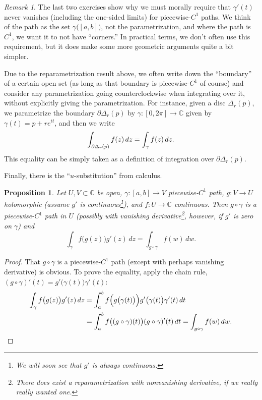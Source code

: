 \documentclass[12pt,openany]{book}
\newcommand{\avoidbreak}{\postdisplaypenalty=100}
\newcommand{\C}{{\mathbb{C}}}
\newcommand{\myquote}[1]{``#1''}
\theoremstyle{plain}
\newtheorem{prop}[thm]{Proposition}
\theoremstyle{remark}
\newtheorem{remark}[thm]{Remark}
\theoremstyle{definition}
\theoremstyle{exercise}
\theoremstyle{example}
\begin{document}
\begin{remark}
The last two exercises show why we must morally
require that $\gamma'(t)$ never vanishes (including the one-sided limits)
for piecewise-$C^1$ paths.
We think of the path
as the set
$\gamma\bigl([a,b]\bigr)$,
not the parametrization, and where the path is $C^1$,
we want it to not have \myquote{corners.}
In practical terms, we don't often use this requirement,
but it does make some more geometric arguments quite a bit simpler.
\end{remark}

Due to the reparametrization result above,
we often write down the \myquote{boundary} of a certain open set
(as long as that boundary is piecewise-$C^1$ of course)
and consider any parametrization going counterclockwise
when integrating over it, without explicitly giving the parametrization.
For instance, given a disc $\Delta_r(p)$, we parametrize
the boundary $\partial \Delta_r(p)$ by
$\gamma  \colon [0,2\pi] \to \C$ given by $\gamma(t) = p +
re^{it}$, and then we write
%
\begin{equation*}
\int_{\partial \Delta_r(p)} f(z) \, dz
=
\int_{\gamma} f(z) \, dz .
\avoidbreak
\end{equation*}
This equality can be simply taken as a definition of integration over
$\partial \Delta_r(p)$.

Finally, there is the \myquote{$u$-substitution} from calculus.

\begin{prop} \label{prop:usubst}
Let $U,V \subset \C$ be open, $\gamma \colon [a,b] \to V$ 
piecewise-$C^1$ path, $g \colon V \to U$ holomorphic (assume $g'$ is
continuous\footnote{We will soon see that $g'$ is always continuous.}), and $f \colon U \to \C$
continuous.  Then $g \circ \gamma$ is a piecewise-$C^1$ path in $U$
(possibly with vanishing derivative\footnote{%
There does exist a reparametrization with nonvanishing derivative, if we really
really wanted one.},
however, if $g'$ is zero on $\gamma$) and
\begin{equation*}
\int_{\gamma} f\bigl(g(z)\bigr) g'(z) \, dz
=
\int_{g \circ \gamma} f(w) \, dw .
\end{equation*}
\end{prop}

\begin{proof}
That $g \circ \gamma$ is a piecewise-$C^1$ path (except with perhaps
vanishing derivative) is obvious.  To prove the equality,
apply the chain rule,
$(g \circ \gamma)'(t) = g'\bigl(\gamma(t)\bigr) \gamma'(t)$:
\begin{equation*}
\begin{split}
\int_{\gamma} f\bigl(g(z)\bigr) g'(z) \, dz
& =
\int_a^b
f\Bigl(g\bigl(\gamma(t)\bigr)\Bigr) g'\bigl(\gamma(t)\bigr) \gamma'(t) \, dt
\\
& =
\int_a^b
f\bigl((g \circ \gamma)(t)\bigr) (g \circ \gamma)'(t) \, dt
=
\int_{g \circ \gamma} f(w) \, dw . \qedhere
\end{split}
\end{equation*}
\end{proof}
\end{document}

